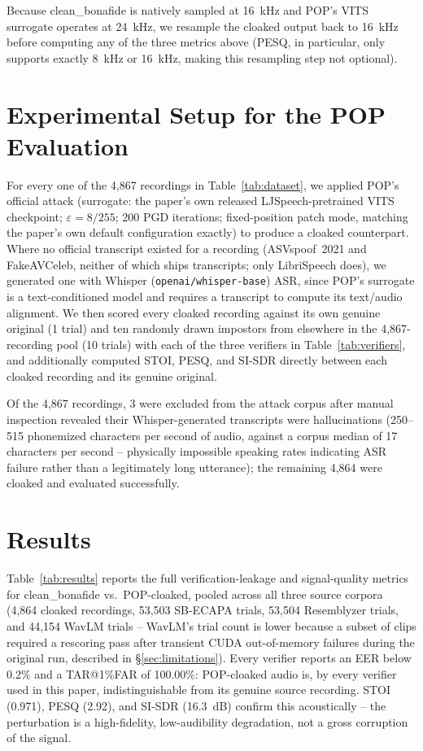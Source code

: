 \documentclass[11pt]{article}
\begin{document}
Because clean\_bonafide is natively sampled at 16~kHz and POP's VITS
surrogate operates at 24~kHz, we resample the cloaked output back to
16~kHz before computing any of the three metrics above (PESQ, in
particular, only supports exactly 8~kHz or 16~kHz, making this
resampling step not optional).

\section{Experimental Setup for the POP Evaluation}
\label{sec:setup}

For every one of the 4,867 recordings in Table~\ref{tab:dataset}, we
applied POP's official attack (surrogate: the paper's own released
LJSpeech-pretrained VITS checkpoint; $\varepsilon=8/255$; 200 PGD
iterations; fixed-position patch mode, matching the paper's own
default configuration exactly) to produce a cloaked counterpart. Where
no official transcript existed for a recording (ASVspoof~2021 and
FakeAVCeleb, neither of which ships transcripts; only LibriSpeech
does), we generated one with Whisper (\texttt{openai/whisper-base})
ASR, since POP's surrogate is a text-conditioned model and requires a
transcript to compute its text/audio alignment. We then scored every
cloaked recording against its own genuine original (1 trial) and ten
randomly drawn impostors from elsewhere in the 4,867-recording pool
(10 trials) with each of the three verifiers in
Table~\ref{tab:verifiers}, and additionally computed STOI, PESQ, and
SI-SDR directly between each cloaked recording and its genuine
original.

Of the 4,867 recordings, 3 were excluded from the attack corpus after
manual inspection revealed their Whisper-generated transcripts were
hallucinations (250--515 phonemized characters per second of audio,
against a corpus median of 17 characters per second -- physically
impossible speaking rates indicating ASR failure rather than a
legitimately long utterance); the remaining 4,864 were cloaked and
evaluated successfully.

\section{Results}
\label{sec:results}

Table~\ref{tab:results} reports the full verification-leakage and
signal-quality metrics for clean\_bonafide vs.\ POP-cloaked, pooled
across all three source corpora (4,864 cloaked recordings, 53,503
SB-ECAPA trials, 53,504 Resemblyzer trials, and 44,154 WavLM trials --
WavLM's trial count is lower because a subset of clips required a
rescoring pass after transient CUDA out-of-memory failures during the
original run, described in \S\ref{sec:limitations}). Every verifier
reports an EER below 0.2\% and a TAR@1\%FAR of 100.00\%: POP-cloaked
audio is, by every verifier used in this paper, indistinguishable from
its genuine source recording. STOI (0.971), PESQ (2.92), and SI-SDR
(16.3~dB) confirm this acoustically -- the perturbation is a
high-fidelity, low-audibility degradation, not a gross corruption of
the signal.
\end{document}
